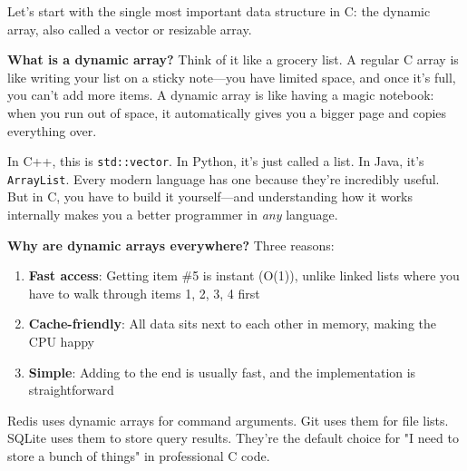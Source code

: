 Let's start with the single most important data structure in C: the dynamic array, also called a vector or resizable array.

\textbf{What is a dynamic array?} Think of it like a grocery list. A regular C array is like writing your list on a sticky note—you have limited space, and once it's full, you can't add more items. A dynamic array is like having a magic notebook: when you run out of space, it automatically gives you a bigger page and copies everything over.

In C++, this is \texttt{std::vector}. In Python, it's just called a list. In Java, it's \texttt{ArrayList}. Every modern language has one because they're incredibly useful. But in C, you have to build it yourself—and understanding how it works internally makes you a better programmer in \textit{any} language.

\textbf{Why are dynamic arrays everywhere?} Three reasons:
\begin{enumerate}
    \item \textbf{Fast access}: Getting item \#5 is instant (O(1)), unlike linked lists where you have to walk through items 1, 2, 3, 4 first
    \item \textbf{Cache-friendly}: All data sits next to each other in memory, making the CPU happy
    \item \textbf{Simple}: Adding to the end is usually fast, and the implementation is straightforward
\end{enumerate}

Redis uses dynamic arrays for command arguments. Git uses them for file lists. SQLite uses them to store query results. They're the default choice for "I need to store a bunch of things" in professional C code.

